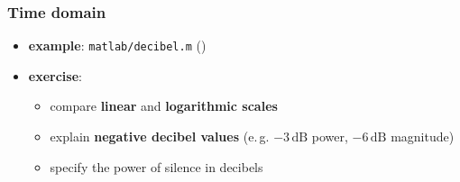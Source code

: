 \begin{frame} %
	\frametitle{Time domain}
	\begin{itemize}
		\item \textbf{example}: \texttt{matlab/decibel.m} () 
			\begin{figure}
				\centering
				\begin{subfigure}[c]{0.48\linewidth}
				\end{subfigure}
				\hspace{0.01\linewidth}
				\begin{subfigure}[c]{0.48\linewidth}
				\end{subfigure}
			\end{figure}
		\item \textbf{exercise}:
			\begin{itemize}
				\item compare \textbf{linear} and \textbf{logarithmic scales}
				\item explain \textbf{negative decibel values} (e.\,g. $-3\,\textrm{dB}$ power, $-6\,\textrm{dB}$ magnitude)
				\item specify the power of silence in decibels
			\end{itemize}
	\end{itemize}
\end{frame}

